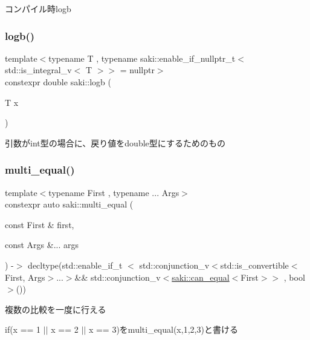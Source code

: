 コンパイル時logb 

\mbox{\label{namespacesaki_adf4ba562bb9897e98b75eb95027bfad5}} 
\subsubsection{\texorpdfstring{logb()}{logb()}\hspace{0.1cm}{\footnotesize\ttfamily [2/2]}}
{\footnotesize\ttfamily template$<$typename T , typename saki\+::enable\+\_\+if\+\_\+nullptr\+\_\+t$<$ std\+::is\+\_\+integral\+\_\+v$<$ T $>$$>$  = nullptr$>$ \\
constexpr double saki\+::logb (\begin{DoxyParamCaption}\item[{T}]{x }\end{DoxyParamCaption})}



引数がint型の場合に、戻り値をdouble型にするためのもの 

\mbox{\label{namespacesaki_a9f7f1252e3ed939885a3b4c4b09943b8}} 
\subsubsection{\texorpdfstring{multi\+\_\+equal()}{multi\_equal()}}
{\footnotesize\ttfamily template$<$typename First , typename ... Args$>$ \\
constexpr auto saki\+::multi\+\_\+equal (\begin{DoxyParamCaption}\item[{const First \&}]{first,  }\item[{const Args \&...}]{args }\end{DoxyParamCaption}) -\/$>$ decltype(std\+::enable\+\_\+if\+\_\+t $<$
			std\+::conjunction\+\_\+v$<$std\+::is\+\_\+convertible$<$First, Args$>$...$>$\&\&
			std\+::conjunction\+\_\+v$<$\mbox{\hyperlink{structsaki_1_1can__equal}{saki\+::can\+\_\+equal}}$<$First$>$$>$
			, bool$>$())
	}



複数の比較を一度に行える 

if(x == 1 $\vert$$\vert$ x == 2 $\vert$$\vert$ x == 3)をmulti\+\_\+equal(x,1,2,3)と書ける \mbox{\label{namespacesaki_a0ca208fb45c585d9cd23276fb91e40ee}} 
